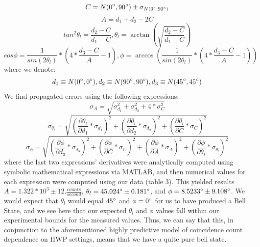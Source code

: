 \documentclass{article}
\begin{document}
    \begin{equation}
        C = N(0\degree,90\degree) \pm \sigma_{N(0\degree,90\degree)}
    \end{equation}
    \begin{equation}
        A = d_1 + d_2 - 2C
    \end{equation}
    \begin{equation}
        tan^2\theta_l = \frac{d_2 - C}{d_1 - C}, \theta_l = \arctan(\sqrt{\frac{d_2 - C}{d_1 - C}})
    \end{equation}
    \begin{equation}
        cos\phi = \frac{1}{sin(2\theta_l)}*(4*\frac{d_3 - C}{A} - 1), \phi = \arccos(\frac{1}{sin(2\theta_l)}*(4*\frac{d_3 - C}{A} - 1))
    \end{equation}
    where we denote:
    \begin{equation}
        d_1 \equiv N(0\degree,0\degree), d_2 \equiv N(90\degree,90\degree), d_3 \equiv N(45\degree,45\degree)
    \end{equation}
    We find propagated errors using the following expressions:
    \begin{equation}
        \sigma_A = \sqrt{\sigma_{d_1}^2 + \sigma_{d_2}^2 + 4*\sigma_C^2}
    \end{equation}
    \begin{equation}
        \sigma_{\theta_l} = \sqrt{(\frac{\partial{\theta_l}}{\partial{d_1}}*\sigma_{d_1})^2 + (\frac{\partial{\theta_l}}{\partial{d_2}}*\sigma_{d_2})^2 + ( \frac{\partial{\theta_l}}{\partial{C}}*\sigma_{C})^2}
    \end{equation}
    \begin{equation}
        \sigma_{\phi} = \sqrt{(\frac{\partial{\phi}}{\partial{d_3}}*\sigma_{d_3})^2 + (\frac{\partial{\phi}}{\partial{C}}*\sigma_{C})^2 + (\frac{\partial{\phi}}{\partial{A}}*\sigma_{A})^2 + (\frac{\partial{\phi}}{\partial{\theta_l}}*\sigma_{\theta_l})^2}
    \end{equation}
    where the last two expressions' derivatives were analytically computed using symbolic mathematical expressions via MATLAB, and then numerical values for each expression were computed using our data (table 3). This yielded results $A = 1.322*10^3 \pm 12. \frac{counts}{second}$, $\theta_l = 45.024\degree \pm 0.181 \degree$, and $\phi = 8.5233\degree \pm 9.108\degree$. We would expect that $\theta_l$ would equal $45\degree$ and $\phi = 0\degree$ for us to have produced a Bell State, and we see here that our expected $\theta_l$ and $\phi$ values fall within our experimental bounds for the measured values. Thus, we can say that this, in conjunction to the aforementioned highly predictive model of coincidence count dependence on HWP settings, means that we have a quite pure bell state. 
\end{document}
